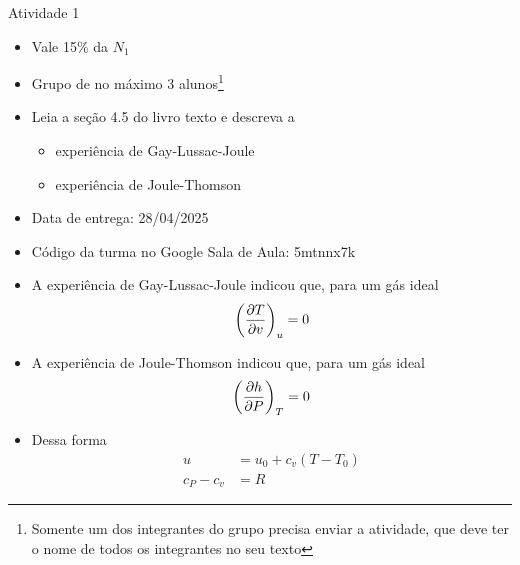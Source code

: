 \documentclass[t,%
brazilian,%
11pt,%
aspectratio=169,%
table%
]{beamer}
\begin{document}
\begin{frame}{Atividade 1}
    \begin{itemize}
        \item Vale 15\% da \(N_1\)
        \item Grupo de no máximo 3 alunos\footnote{Somente um dos integrantes do 
            grupo precisa enviar a atividade, que deve ter o nome de todos os integrantes no seu texto}
        \item Leia a seção 4.5 do livro texto e descreva a
            \begin{itemize}
                \item experiência de Gay-Lussac-Joule
                \item experiência de Joule-Thomson
            \end{itemize}
        \item Data de entrega: 28/04/2025
        \item Código da turma no Google Sala de Aula: 5mtnnx7k
    \end{itemize}
\end{frame}

\begin{frame}
    \begin{itemize}
        \item A experiência de Gay-Lussac-Joule indicou que, para 
            um gás ideal
            \[
                \left(\frac{\partial T}{\partial v}\right)_u = 0
            \]
        \item A experiência de Joule-Thomson indicou que, para um gás 
            ideal
            \[
                \left(\frac{\partial h}{\partial P}\right)_T = 0
            \]
        \item Dessa forma
            \begin{align*}
                u &= u_0 + c_v (T-T_0) \\
                c_P - c_v &= R
            \end{align*}
    \end{itemize}
\end{frame}

\end{document}

